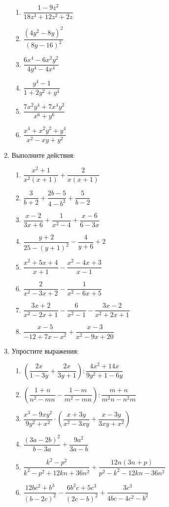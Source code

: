 \documentclass[12pt, a4paper]{article}
\begin{document}
\begin{enumerate}
\begin{multicols}{2}
\begin{enumerate}[label=\asbuk*)]
				\item \(\dfrac{1-9z^2}{18z^3+12z^2+2z}\)
				\item \(\dfrac{(4y^2-8y)^2}{(8y-16)^2}\)
				\item \(\dfrac{6x^4-6x^2y^2}{4y^4-4x^4}\)
				\item \(\dfrac{y^4-1}{1+2y^2+y^4}\)
				\item \(\dfrac{7x^2y^4+7x^4y^2}{x^6+y^6}\)
				\item \(\dfrac{x^4+x^2y^2+y^4}{x^2-xy+y^2}\)
		\end{enumerate}
	\end{multicols}	
		\item Выполните действия:
		 \begin{multicols}{2}
		 	\begin{enumerate}[label=\asbuk*)]
		 		\item \(\dfrac{x^2+1}{x^2(x+1)}+\dfrac{2}{x(x+1)}\)
		 		\item \(\dfrac{3}{b+2}+\dfrac{2b-5}{4-b^2}+\dfrac{5}{b-2}\)
		 		\item \(\dfrac{x-2}{3x+6}+\dfrac{1}{x^2-4}+\dfrac{x-6}{6-3x}\)
		 		\item \(\dfrac{y+2}{25-(y+1)^2}-\dfrac{4}{y+6}+2\)
		 		\item \(\dfrac{x^2+5x+4}{x+1}-\dfrac{x^2-4x+3}{x-1}\)
		 		\item \(\dfrac{2}{x^2-3x+2}-\dfrac{1}{x^2-6x+5}\)
		 		\item \(\dfrac{3x+2}{x^2-2x+1}-\dfrac{6}{x^2-1}-\dfrac{3x-2}{x^2+2x+1}\)
		 		\item \(\dfrac{x-5}{-12+7x-x^2}+\dfrac{x-3}{x^2-9x+20}\)
		 	\end{enumerate}
	 	\end{multicols}	
 	\item Упростите выражения:
 		\begin{enumerate}[label=\asbuk*)]
 			\item \(\left( \dfrac{2x}{1-3y}+\dfrac{2x}{3y+1} \right):\dfrac{4x^2+14x}{9y^2+1-6y}\)
 			\item \(\left( \dfrac{1+n}{n^2-mn}-\dfrac{1-m}{m^2-mn} \right):\dfrac{m+n}{m^2n-n^2m}\)
 			\item \(\dfrac{x^3-9xy^2}{9y^2+x^2}\cdot\left( \dfrac{x+3y}{x^2-3xy} +\dfrac{x-3y}{3xy+x^2}\right)\)
 			\item \(\dfrac{(3a-2b)^2}{b-3a}+\dfrac{9a^2}{3a-b}\)
 			\item \(\dfrac{k^2-p^2}{k^2-p^2+12kn+36n^2}+\dfrac{12n(3n+p)}{p^2-k^2-12kn-36n^2}\)
 			\item \(\dfrac{12bc^2+b^3}{(b-2c)^2}-\dfrac{6b^2c+5c^3}{(2c-b)^2}+\dfrac{3c^3}{4bc-4c^2-b^2}\)

\end{enumerate}
\end{enumerate}
\end{document}
